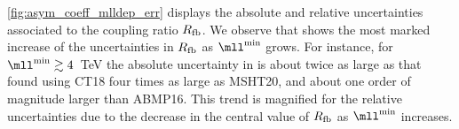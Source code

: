 \cref{fig:asym_coeff_mlldep_err} displays the 
absolute  and relative  uncertainties
associated to the coupling ratio $R_{\rm fb}$.
%
We observe that  shows
the most marked increase of the uncertainties in $R_{\rm fb}$
as $\mll^{\rm min}$ grows.
%
For instance, for  $\mll^{\rm min}\gtrsim4$~TeV
the absolute \pdf uncertainty in 
is about twice as large as that found using CT18 
four times as large as MSHT20,
and about one order of magnitude larger than ABMP16.
%
This trend is magnified for the relative uncertainties
due to the decrease in the central value of $R_{\rm fb}$
as $\mll^{\rm min}$ increases.
